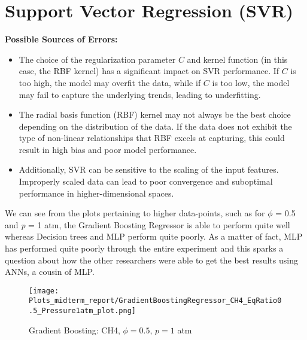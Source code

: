 \documentclass[12pt]{report}
\begin{document}
\section{Support Vector Regression (SVR)}
\textbf{Possible Sources of Errors:} 
\begin{itemize}
    \item The choice of the regularization parameter \(C\) and kernel function (in this case, the RBF kernel) has a significant impact on SVR performance. If \(C\) is too high, the model may overfit the data, while if \(C\) is too low, the model may fail to capture the underlying trends, leading to underfitting.
    \item The radial basis function (RBF) kernel may not always be the best choice depending on the distribution of the data. If the data does not exhibit the type of non-linear relationships that RBF excels at capturing, this could result in high bias and poor model performance.
    \item Additionally, SVR can be sensitive to the scaling of the input features. Improperly scaled data can lead to poor convergence and suboptimal performance in higher-dimensional spaces.
\end{itemize}

We can see from the plots pertaining to higher data-points, such as for $\phi$ = 0.5 and \textit{p} = 1 atm, the Gradient Boosting Regressor is able to perform quite well whereas Decision trees and MLP perform quite poorly. As a matter of fact, MLP has performed quite poorly through the entire experiment and this sparks a question about how the other researchers were able to get the best results using ANNs, a cousin of MLP.










\begin{figure}[H]
    \centering
    \texttt{[image: Plots\_midterm\_report/GradientBoostingRegressor\_CH4\_EqRatio0.5\_Pressure1atm\_plot.png]}
    \caption{Gradient Boosting: CH4, $\phi = 0.5$, $p = 1$ atm}
\end{figure}
\end{document}
